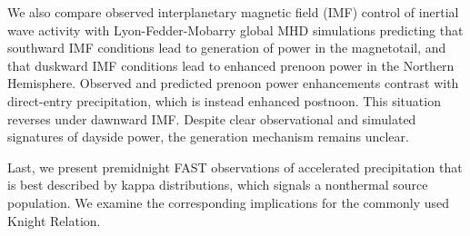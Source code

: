 We also compare observed interplanetary magnetic field (IMF) control
of inertial \Alf wave activity with Lyon-Fedder-Mobarry global MHD
simulations predicting that southward IMF conditions lead to
generation of \Alfic power in the magnetotail, and that duskward IMF
conditions lead to enhanced prenoon \Alfic power in the Northern
Hemisphere. Observed and predicted prenoon \Alfic power enhancements
contrast with direct-entry precipitation, which is instead enhanced
postnoon. This situation reverses under dawnward IMF. Despite clear
observational and simulated signatures of dayside \Alfic power, the
generation mechanism remains unclear.

Last, we present premidnight FAST observations of accelerated
precipitation that is best described by kappa distributions, which
signals a nonthermal source population. We examine the corresponding
implications for the commonly used Knight Relation.




